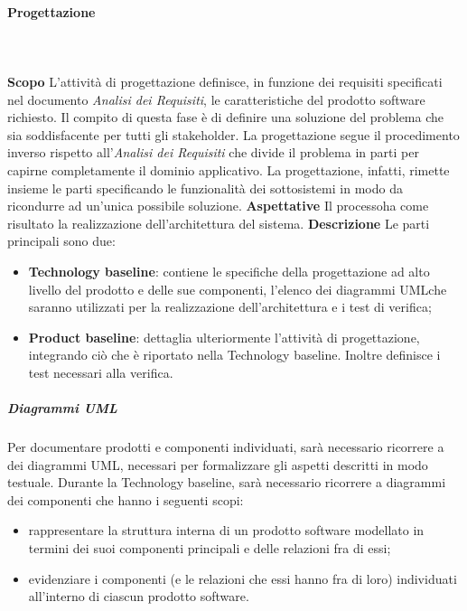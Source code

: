 		\paragraph{Progettazione} \mbox{}\\ \mbox{}\\
			\textbf{Scopo} \newline \newline
			L'attività di progettazione definisce, in funzione dei requisiti specificati nel documento \textit{Analisi dei Requisiti}, le caratteristiche del prodotto software richiesto. Il compito di questa fase è di definire una soluzione del problema che sia soddisfacente per tutti gli stakeholder\glo. La progettazione segue il procedimento inverso rispetto all'\textit{Analisi dei Requisiti} che divide il problema in parti per capirne completamente il dominio applicativo. La progettazione, infatti, rimette insieme le parti specificando le funzionalità dei sottosistemi in modo da ricondurre ad un'unica possibile soluzione. \newline \newline
			\textbf{Aspettative} \newline \newline
			Il processo\glosp ha come risultato la realizzazione dell'architettura del sistema. \newline \newline
			\textbf{Descrizione} \newline \newline
			Le parti principali sono due:
			\begin{itemize}
				\item \textbf{Technology baseline}\glo: contiene le specifiche della progettazione ad alto livello del prodotto e delle sue componenti, l'elenco dei diagrammi UML\glosp che saranno utilizzati per la realizzazione dell'architettura e i test di verifica;
				\item \textbf{Product baseline}\glo: dettaglia ulteriormente l'attività di progettazione, integrando ciò che è riportato nella Technology baseline. Inoltre definisce i test necessari alla verifica.
			\end{itemize}
			\subparagraph{Diagrammi UML}
			Per documentare prodotti e componenti individuati, sarà necessario ricorrere a dei diagrammi UML\glo, necessari per formalizzare gli aspetti descritti in modo testuale. Durante la Technology baseline, sarà necessario ricorrere a diagrammi dei componenti che hanno i seguenti scopi:
			\begin{itemize}
				\item rappresentare la struttura interna di un prodotto software modellato in termini dei suoi componenti principali e delle relazioni fra di essi;
				\item evidenziare i componenti (e le relazioni che essi hanno fra di loro)
individuati all'interno di ciascun prodotto software.
			\end{itemize}
